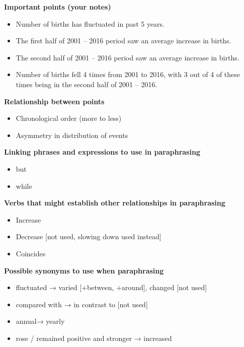 \documentclass[
  openany]{book}
\providecommand{\tightlist}{%
  \setlength{\itemsep}{0pt}\setlength{\parskip}{0pt}}
\begin{document}
\textbf{Important points (your notes)}

\begin{itemize}
\tightlist
\item
  Number of births has fluctuated in past 5 years.
\item
  The first half of 2001 -- 2016 period saw an average increase in births.
\item
  The second half of 2001 -- 2016 period saw an average increase in births.
\item
  Number of births fell 4 times from 2001 to 2016, with 3 out of 4 of these times being in the second half of 2001 -- 2016.
\end{itemize}

\textbf{Relationship between points}

\begin{itemize}
\tightlist
\item
  Chronological order (more to less)\\
\item
  Asymmetry in distribution of events
\end{itemize}

\textbf{Linking phrases and expressions to use in paraphrasing}

\begin{itemize}
\tightlist
\item
  but\\
\item
  while
\end{itemize}

\textbf{Verbs that might establish other relationships in paraphrasing}

\begin{itemize}
\tightlist
\item
  Increase\\
\item
  Decrease {[}not used, slowing down used instead{]}\\
\item
  Coincides
\end{itemize}

\textbf{Possible synonyms to use when paraphrasing}

\begin{itemize}
\tightlist
\item
  fluctuated → varied {[}+between, +around{]}, changed {[}not used{]}
\item
  compared with → in contrast to {[}not used{]}
\item
  annual→ yearly
\item
  rose / remained positive and stronger → increased
\end{itemize}
\end{document}
